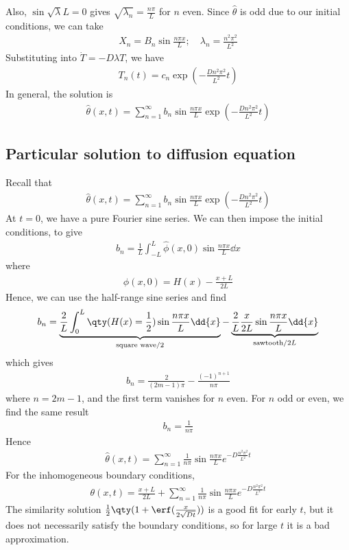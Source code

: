 Also, $\sin \sqrt{\lambda} L = 0$ gives $\sqrt{\lambda_n} = \frac{n \pi}{L}$ for $n$ even.
Since $\hat \theta$ is odd due to our initial conditions, we can take
\begin{align*}
	X_n = B_n \sin \frac{n \pi x}{L}; \quad \lambda_n = \frac{n^2 \pi^2}{L^2}
\end{align*}
Substituting into $\dot T = -D \lambda T$, we have
\begin{align*}
	T_n(t) = c_n \exp(-\frac{Dn^2 \pi^2}{L^2} t )
\end{align*}
In general, the solution is
\begin{align*}
	\hat \theta(x,t) = \sum_{n=1}^\infty b_n \sin \frac{n \pi x}{L} \exp(-\frac{Dn^2 \pi^2}{L^2} t )
\end{align*}

\subsection{Particular solution to diffusion equation}
Recall that
\begin{align*}
	\hat \theta(x,t) = \sum_{n=1}^\infty b_n \sin \frac{n \pi x}{L} \exp(-\frac{Dn^2 \pi^2}{L^2} t )
\end{align*}
At $t = 0$, we have a pure Fourier sine series.
We can then impose the initial conditions, to give
\begin{align*}
	b_n = \frac{1}{L} \int_{-L}^L \hat \phi(x,0) \sin \frac{n \pi x}{L} \dd{x}
\end{align*}
where
\begin{align*}
	\hat\phi(x,0) = H(x) - \frac{x+L}{2L}
\end{align*}
Hence, we can use the half-range sine series and find
\begin{align*}
	b_n = \underbrace{ \frac{2}{L} \int_0^L \qty(H(x) = \frac{1}{2}) \sin \frac{n \pi x}{L} \dd{x} }_{\text{square wave}/2} - \underbrace{ \frac{2}{L}\frac{x}{2L} \sin \frac{n \pi x}{L} \dd{x} }_{\text{sawtooth}/2L}
\end{align*}
which gives
\begin{align*}
	b_n = \frac{2}{(2m-1)\pi} - \frac{(-1)^{n+1}}{n\pi}
\end{align*}
where $n = 2m - 1$, and the first term vanishes for $n$ even.
For $n$ odd or even, we find the same result
\begin{align*}
	b_n = \frac{1}{n\pi}
\end{align*}
Hence
\begin{align*}
	\hat\theta(x,t) = \sum_{n=1}^\infty \frac{1}{n \pi} \sin \frac{n \pi x}{L} e^{-D \frac{n^2 \pi^2}{L^2} t}
\end{align*}
For the inhomogeneous boundary conditions,
\begin{align*}
	\theta(x,t) = \frac{x+L}{2L} + \sum_{n=1}^\infty \frac{1}{n \pi} \sin \frac{n \pi x}{L} e^{-D \frac{n^2 \pi^2}{L^2} t}
\end{align*}
The similarity solution $\frac{1}{2}\qty(1 + \erf(\frac{x}{2\sqrt{Dt}}))$ is a good fit for early $t$, but it does not necessarily satisfy the boundary conditions, so for large $t$ it is a bad approximation.

